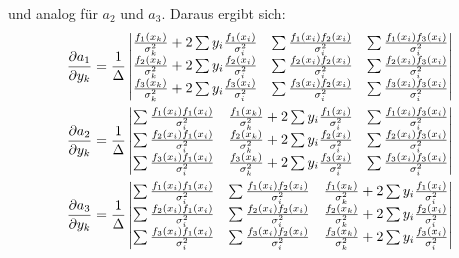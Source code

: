 \documentclass[prb,12pt]{revtex4-2}
\theoremstyle{definition}
\theoremstyle{definition}
\begin{document}
und analog für $a_2$ und $a_3$. Daraus ergibt sich:
\begin{align*}
	\pdv{a_1}{y_k}&=\frac 1\Delta\begin{vmatrix}
		\frac{f_1(x_k)}{\sigma_k^2}+2\sum y_i \frac{f_1(x_i)}{\sigma_i^2} & \sum \frac{f_1(x_i)f_2(x_i)}{\sigma_i^2} & \sum \frac{f_1(x_i)f_3(x_i)}{\sigma_i^2} \\
		\frac{f_2(x_k)}{\sigma_k^2}+2\sum y_i \frac{f_2(x_i)}{\sigma_i^2} & \sum \frac{f_2(x_i)f_2(x_i)}{\sigma_i^2} & \sum \frac{f_2(x_i)f_3(x_i)}{\sigma_i^2} \\
		\frac{f_3(x_k)}{\sigma_k^2}+2\sum y_i \frac{f_3(x_i)}{\sigma_i^2} & \sum \frac{f_3(x_i)f_2(x_i)}{\sigma_i^2} & \sum \frac{f_3(x_i)f_3(x_i)}{\sigma_i^2}
	\end{vmatrix}\\
\pdv{a_2}{y_k}&=\frac 1\Delta\begin{vmatrix}
	\sum \frac{f_1(x_i)f_1(x_i)}{\sigma_i^2} & \frac{f_1(x_k)}{\sigma_k^2}+2\sum y_i \frac{f_1(x_i)}{\sigma_i^2} & \sum \frac{f_1(x_i)f_3(x_i)}{\sigma_i^2} \\
	\sum \frac{f_2(x_i)f_1(x_i)}{\sigma_i^2} & \frac{f_2(x_k)}{\sigma_k^2}+2\sum y_i \frac{f_2(x_i)}{\sigma_i^2} & \sum \frac{f_2(x_i)f_3(x_i)}{\sigma_i^2} \\
	\sum \frac{f_3(x_i)f_1(x_i)}{\sigma_i^2} & \frac{f_3(x_k)}{\sigma_k^2}+2\sum y_i \frac{f_3(x_i)}{\sigma_i^2} & \sum \frac{f_3(x_i)f_3(x_i)}{\sigma_i^2}
\end{vmatrix}\\
\pdv{a_3}{y_k}&=\frac 1\Delta\begin{vmatrix}
	\sum \frac{f_1(x_i)f_1(x_i)}{\sigma_i^2} & \sum \frac{f_1(x_i)f_2(x_i)}{\sigma_i^2} &   \frac{f_1(x_k)}{\sigma_k^2}+2\sum y_i \frac{f_1(x_i)}{\sigma_i^2} \\
	\sum \frac{f_2(x_i)f_1(x_i)}{\sigma_i^2} & \sum \frac{f_2(x_i)f_2(x_i)}{\sigma_i^2} &  	\frac{f_2(x_k)}{\sigma_k^2}+2\sum y_i \frac{f_2(x_i)}{\sigma_i^2} \\
	\sum \frac{f_3(x_i)f_1(x_i)}{\sigma_i^2} & \sum \frac{f_3(x_i)f_2(x_i)}{\sigma_i^2} & \frac{f_3(x_k)}{\sigma_k^2}+2\sum y_i \frac{f_3(x_i)}{\sigma_i^2}
\end{vmatrix}
\end{align*}
\end{document}
